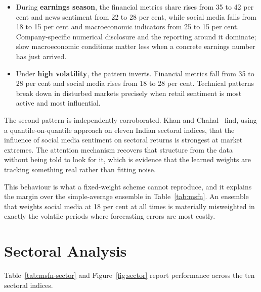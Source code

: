 \begin{itemize}
\item During \textbf{earnings season}, the financial metrics share rises from 35 to 42 per cent
and news sentiment from 22 to 28 per cent, while social media falls from 18 to 15 per cent and
macroeconomic indicators from 25 to 15 per cent. Company-specific numerical disclosure and the
reporting around it dominate; slow macroeconomic conditions matter less when a concrete earnings
number has just arrived.
\item Under \textbf{high volatility}, the pattern inverts. Financial metrics fall from 35 to 28
per cent and social media rises from 18 to 28 per cent. Technical patterns break down in
disturbed markets precisely when retail sentiment is most active and most influential.
\end{itemize}

The second pattern is independently corroborated. Khan and Chahal~\cite{khan2025asymmetric} find,
using a quantile-on-quantile approach on eleven Indian sectoral indices, that the influence of
social media sentiment on sectoral returns is strongest at market extremes. The attention
mechanism recovers that structure from the data without being told to look for it, which is
evidence that the learned weights are tracking something real rather than fitting noise.

This behaviour is what a fixed-weight scheme cannot reproduce, and it explains the margin over
the simple-average ensemble in Table~\ref{tab:msfn}. An ensemble that weights social media at 18
per cent at all times is materially misweighted in exactly the volatile periods where forecasting
errors are most costly.

\section{Sectoral Analysis}
\label{sec:msfn-sector}

Table~\ref{tab:msfn-sector} and Figure~\ref{fig:sector} report performance across the ten
sectoral indices.

